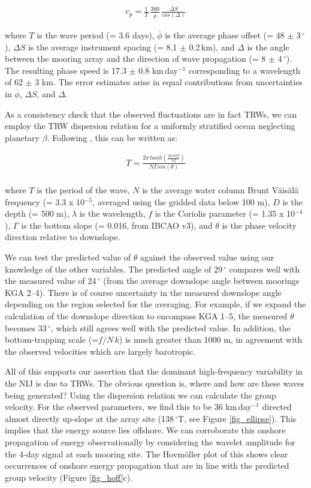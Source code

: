 \documentclass[12pt,titlepage,figuresatend]{article}
\begin{document}
\begin{eqnarray*}
  c_p = \frac{1}{T}\, \frac{360}{\overline{\phi}}\, \frac{\overline{\Delta S}}{cos(\Delta)}
\end{eqnarray*}

where $T$ is the wave period (= 3.6 days), $\overline{\phi}$ is the average phase offset (= 48 $\pm$ 3$\,^{\circ}$), $\Delta S$ is the average instrument spacing (= 8.1 $\pm$ 0.2$\,$km), and $\Delta$ is the angle between the mooring array and the direction of wave propagation (= 8 $\pm$ 4$\,^{\circ}$). The resulting phase speed is 17.3 $\pm$ 0.8 km$\,$day$^{-1}$ corresponding to a wavelength of 62 $\pm$ 3 km. The error estimates arise in equal contributions from uncertainties in $\overline{\phi}$, $\Delta S$, and $\Delta$.

As a consistency check that the observed fluctuations are in fact TRWs, we can employ the TRW dispersion relation for a uniformly stratified ocean neglecting planetary $\beta$. Following \cite{Pedlosky1979}, this can be written as:

\begin{eqnarray*}
  T = \frac{2\pi \,tanh(\frac{2\pi ND}{\lambda f})}{N\Gamma sin(\theta)}\\
\end{eqnarray*}

where $T$ is the period of the wave, $N$ is the average water column Brunt V{\"a}is{\"a}l{\"a} frequency (= 3.3 x 10$^{-5}$, averaged using the gridded data below 100 m), $D$ is the depth (= 500 m), $\lambda$ is the wavelength, $f$ is the Coriolis parameter (= 1.35 x 10$^{-4}$), $\Gamma$ is the bottom slope (= 0.016, from IBCAO v3), and $\theta$ is the phase velocity direction relative to downslope.

We can test the predicted value of $\theta$ against the observed value using our knowledge of the other variables. The predicted angle of 29$\,^{\circ}$ compares well with the measured value of 24$\,^{\circ}$ (from the average downslope angle between moorings KGA 2--4). There is of course uncertainty in the measured downslope angle depending on the region selected for the averaging. For example, if we expand the calculation of the downslope direction to encompass KGA 1--5, the measured $\theta$ becomes 33$\,^{\circ}$, which still agrees well with the predicted value. In addition, the bottom-trapping scale (=$f/N\,k$) is much greater than 1000 m, in agreement with the observed velocities which are largely barotropic. 

All of this supports our assertion that the dominant high-frequency variability in the NIJ is due to TRWs. The obvious question is, where and how are these waves being generated? Using the dispersion relation we can calculate the group velocity. For the observed parameters, we find this to be 36 km$\,$day$^{-1}$ directed almost directly up-slope at the array site (138$\,^{\circ}$T, see Figure \ref{fig_ellipse}). This implies that the energy source lies offshore. We can corroborate this onshore propagation of energy observationally by considering the wavelet amplitude for the 4-day signal at each mooring site. The Hovm\"{o}ller plot of this shows clear occurrences of onshore energy propagation that are in line with the predicted group velocity (Figure \ref{fig_hoff}c). 
\end{document}
